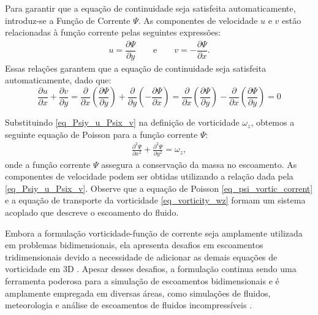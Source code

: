 Para garantir que a equação de continuidade seja satisfeita automaticamente, introduz-se a Função de Corrente $\Psi$. As componentes de velocidade $u$ e $v$ estão relacionadas à função corrente pelas seguintes expressões:
\begin{align}\label{eq_Psiy_u_Psix_v}
    u = \dfrac{\partial \Psi}{\partial y} \qquad \textrm{e} \qquad v = - \dfrac{\partial \Psi}{\partial x}.
\end{align}
Essas relações garantem que a equação de continuidade seja satisfeita automaticamente, dado que:
\begin{equation}
    \frac{\partial u}{\partial x} + \frac{\partial v}{\partial y} = \frac{\partial}{\partial x} \left( \frac{\partial \Psi}{\partial y} \right) + \frac{\partial}{\partial y} \left(-\frac{\partial \Psi}{\partial x} \right) = \frac{\partial}{\partial x} \left( \frac{\partial \Psi}{\partial y} \right) - \frac{\partial}{\partial x} \left( \frac{\partial \Psi}{\partial y} \right) = 0
\end{equation}

Substituindo \autoref{eq_Psiy_u_Psix_v}  na definição de vorticidade \(\omega_z\), obtemos a seguinte equação de Poisson para a função corrente \(\Psi\):
\begin{align}\label{eq_psi_vortic_corrent}
    \frac{\partial^2 \Psi}{\partial x^2}+\frac{\partial^2 \Psi}{\partial y^2}= \omega_z,
\end{align}
onde a função corrente $\Psi$ assegura a conservação da massa no escoamento. As componentes de velocidade podem ser obtidas utilizando a relação dada pela \autoref{eq_Psiy_u_Psix_v}. Observe que a equação de Poisson \ref{eq_psi_vortic_corrent} e a equação de transporte da vorticidade \ref{eq_vorticity_wz} formam um sistema acoplado que descreve o escoamento do fluido.

Embora a formulação vorticidade-função de corrente seja amplamente utilizada em problemas bidimensionais, ela apresenta desafios em escoamentos tridimensionais devido a necessidade de adicionar as demais equações de vorticidade em 3D \cite{zhu2024}. Apesar desses desafios, a formulação continua sendo uma ferramenta poderosa para a simulação de escoamentos bidimensionais e é amplamente empregada em diversas áreas, como simulações de fluidos, meteorologia e análise de escoamentos de fluidos incompressíveis \cite{huang2015}.
